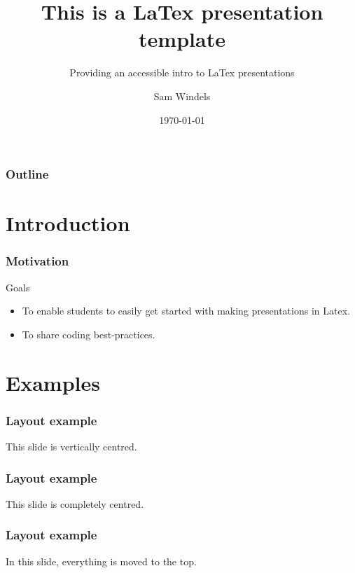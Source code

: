 \documentclass[aspectratio=169]{beamer} %
\title{This is a LaTex presentation template }
\subtitle{Providing an accessible intro to LaTex presentations}
\author{Sam Windels}
\institute{Barcelona Supercomputing Centre}
\date{\today}
\begin{document}
{
\begin{frame}
  \titlepage
\end{frame}
}
\addtocounter{framenumber}{-1} %

\begin{frame}[c]
	\frametitle{Outline}
 	\tableofcontents
\end{frame}


\section{Introduction}	

\begin{frame}[c]
	\sectionpage
\end{frame}

\begin{frame}
\frametitle{Motivation}

\begin{block}{Goals}
	\begin{itemize}
		\item To enable students to easily get started with making presentations in Latex.
		\item To share coding best-practices.
	\end{itemize} 
\end{block}

\end{frame}


\section{Examples}	

\begin{frame}[c]
	\sectionpage
\end{frame}

\begin{frame}[c]
	\frametitle{Layout example}
	This slide is vertically centred. 	
\end{frame}


\begin{frame}[c]
	\frametitle{Layout example}
	\centering This slide is completely centred. 
\end{frame}

\begin{frame}[t]
	\frametitle{Layout example}
	In this slide, everything is moved to the top. 	
\end{frame}
\end{document}
